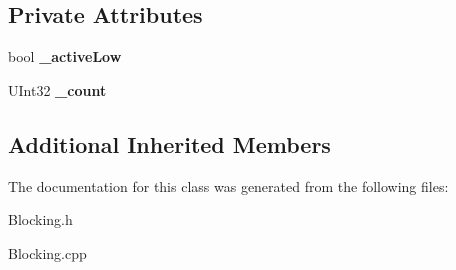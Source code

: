 \subsection*{Private Attributes}
\begin{DoxyCompactItemize}
\item 
\mbox{\label{class_simple_signal_a315367752b9921c04fb7889195880a17}} 
bool {\bfseries \+\_\+active\+Low}
\item 
\mbox{\label{class_simple_signal_a5faf1247f0a7fa1679cfa1e4fc3dfad6}} 
U\+Int32 {\bfseries \+\_\+count}
\end{DoxyCompactItemize}
\subsection*{Additional Inherited Members}


The documentation for this class was generated from the following files\+:\begin{DoxyCompactItemize}
\item 
Blocking.\+h\item 
Blocking.\+cpp\end{DoxyCompactItemize}
